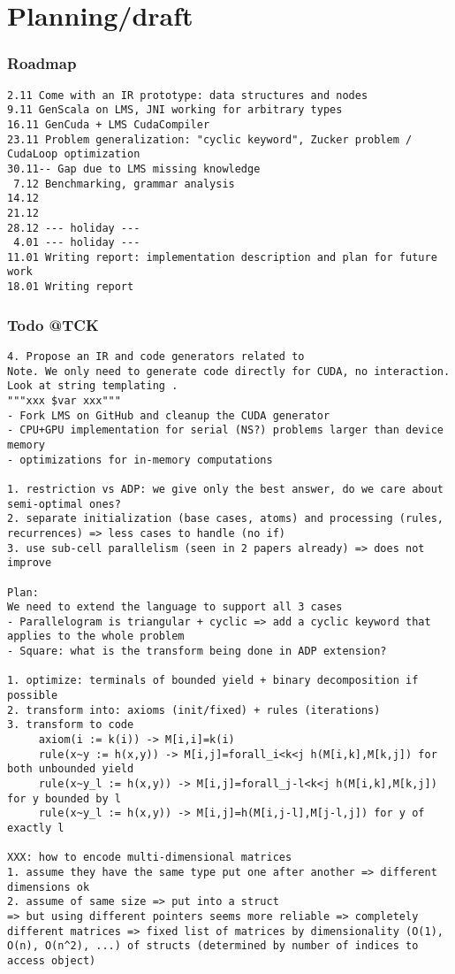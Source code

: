 \documentclass[11pt]{article}
\begin{document}
\newpage
\section{Planning/draft}
\subsubsection*{Roadmap}
\begin{verbatim}
2.11 Come with an IR prototype: data structures and nodes
9.11 GenScala on LMS, JNI working for arbitrary types
16.11 GenCuda + LMS CudaCompiler
23.11 Problem generalization: "cyclic keyword", Zucker problem / CudaLoop optimization
30.11-- Gap due to LMS missing knowledge
 7.12 Benchmarking, grammar analysis
14.12
21.12
28.12 --- holiday ---
 4.01 --- holiday ---
11.01 Writing report: implementation description and plan for future work
18.01 Writing report
\end{verbatim}

\subsubsection*{Todo @TCK}
\begin{verbatim}
4. Propose an IR and code generators related to
Note. We only need to generate code directly for CUDA, no interaction. Look at string templating .
"""xxx $var xxx"""
- Fork LMS on GitHub and cleanup the CUDA generator
- CPU+GPU implementation for serial (NS?) problems larger than device memory
- optimizations for in-memory computations

1. restriction vs ADP: we give only the best answer, do we care about semi-optimal ones?
2. separate initialization (base cases, atoms) and processing (rules, recurrences) => less cases to handle (no if)
3. use sub-cell parallelism (seen in 2 papers already) => does not improve

Plan:
We need to extend the language to support all 3 cases
- Parallelogram is triangular + cyclic => add a cyclic keyword that applies to the whole problem
- Square: what is the transform being done in ADP extension?

1. optimize: terminals of bounded yield + binary decomposition if possible
2. transform into: axioms (init/fixed) + rules (iterations)
3. transform to code
     axiom(i := k(i)) -> M[i,i]=k(i)
     rule(x~y := h(x,y)) -> M[i,j]=forall_i<k<j h(M[i,k],M[k,j]) for both unbounded yield
     rule(x~y_l := h(x,y)) -> M[i,j]=forall_j-l<k<j h(M[i,k],M[k,j]) for y bounded by l
     rule(x~y_l := h(x,y)) -> M[i,j]=h(M[i,j-l],M[j-l,j]) for y of exactly l

XXX: how to encode multi-dimensional matrices
1. assume they have the same type put one after another => different dimensions ok
2. assume of same size => put into a struct
=> but using different pointers seems more reliable => completely different matrices => fixed list of matrices by dimensionality (O(1), O(n), O(n^2), ...) of structs (determined by number of indices to access object)
\end{verbatim}
\end{document}
